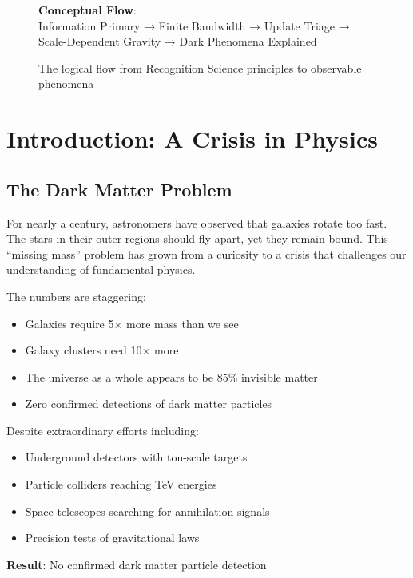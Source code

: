 \documentclass[12pt,letterpaper]{article}
\begin{document}
\begin{figure}[h]
\centering
\begin{tcolorbox}[width=\textwidth, colback=green!5, colframe=green!50!black]
\textbf{Conceptual Flow}:\\[0.5em]
Information Primary → Finite Bandwidth → Update Triage → Scale-Dependent Gravity → Dark Phenomena Explained
\end{tcolorbox}
\caption{The logical flow from Recognition Science principles to observable phenomena}
\end{figure}

\newpage

\section{Introduction: A Crisis in Physics}

\subsection{The Dark Matter Problem}

For nearly a century, astronomers have observed that galaxies rotate too fast. The stars in their outer regions should fly apart, yet they remain bound. This ``missing mass'' problem has grown from a curiosity to a crisis that challenges our understanding of fundamental physics.

The numbers are staggering:
\begin{itemize}
    \item Galaxies require 5× more mass than we see
    \item Galaxy clusters need 10× more
    \item The universe as a whole appears to be 85\% invisible matter
    \item Zero confirmed detections of dark matter particles
\end{itemize}

\begin{tcolorbox}[colback=red!5!white, colframe=red!50!black, title=The Detection Desert]
Despite extraordinary efforts including:
\begin{itemize}[noitemsep]
    \item Underground detectors with ton-scale targets
    \item Particle colliders reaching TeV energies  
    \item Space telescopes searching for annihilation signals
    \item Precision tests of gravitational laws
\end{itemize}
\textbf{Result}: No confirmed dark matter particle detection
\end{tcolorbox}
\end{document}
